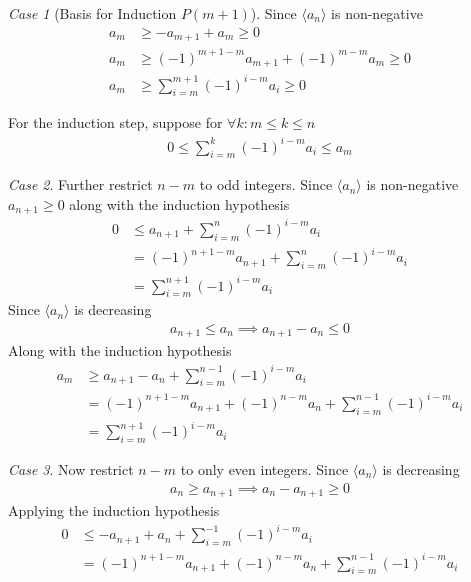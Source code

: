 \documentclass{amsart}
\numberwithin{equation}{section}
\let\oldendproof\endproof
\renewenvironment{proof}[1][\proofname]{%
  \setcounter{case}{0}
  \setcounter{step}{0}
  \oldproof[#1]%
}{\oldendproof}
\theoremstyle{plain}
\theoremstyle{definition}
\theoremstyle{remark}
\newtheorem{case}{Case}
\begin{document}
\begin{proof}
  \begin{case}[Basis for Induction $P(m+1)$]
    Since $\langle a_n \rangle$ is non-negative
    \begin{align*}
      a_m &\geq -a_{m+1} + a_m \geq 0\\
      a_m &\geq (-1)^{m+1-m} a_{m+1} + (-1)^{m-m} a_m \geq 0\\
      a_m &\geq \sum_{i=m}^{m+1} (-1)^{i-m} a_i \geq 0
    \end{align*}
  \end{case}
  For the induction step, suppose for $\forall k: m\leq k \leq n$
  \begin{align}
    0 \leq \sum^k_{i=m} (-1)^{i-m} a_i \leq a_m
  \end{align}
  \begin{case}
    Further restrict $n-m$ to odd integers. Since $\langle a_n \rangle$ is non-negative $a_{n+1} \geq 0$ along with the induction hypothesis
    \begin{align}
      0 &\leq a_{n+1} + \sum^n_{i=m} (-1)^{i-m} a_i\\
      &= (-1)^{n+1-m} a_{n+1} +  \sum^n_{i=m} (-1)^{i-m} a_i\\
      &= \sum^{n+1}_{i=m} (-1)^{i-m} a_i
    \end{align}
    Since $\langle a_n\rangle$ is decreasing
    \begin{align}
      a_{n+1} \leq a_n \implies a_{n+1} - a_n \leq 0
    \end{align}
    Along with the induction hypothesis
    \begin{align}
      a_m &\geq a_{n+1} - a_n + \sum^{n-1}_{i=m} (-1)^{i-m} a_i\\
      &= (-1)^{n+1-m} a_{n+1} + (-1)^{n-m} a_n + \sum_{i=m}^{n-1} (-1)^{i-m} a_i\\
      &= \sum^{n+1}_{i=m} (-1)^{i-m} a_i
    \end{align}
  \end{case}
  \begin{case}
    Now restrict $n-m$ to only even integers.
    Since $\langle a_n \rangle$ is decreasing
    \begin{align}
      a_n \geq a_{n+1} \implies a_n - a_{n+1} \geq 0
    \end{align}
    Applying the induction hypothesis
    \begin{align}
      0 &\leq -a_{n+1} + a_n + \sum_{i=m}^{-1} (-1)^{i-m} a_i\\
      &=(-1)^{n+1-m} a_{n+1} + (-1)^{n-m} a_n + \sum_{i=m}^{n-1} (-1)^{i-m} a_i\\

\end{align}
\end{case}
\end{proof}
\end{document}
